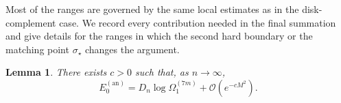 \documentclass[a4paper]{article}
\newtheorem{lemma}[theorem]{Lemma}
\numberwithin{equation}{section}
\begin{document}

Most of the ranges are governed by the same local estimates as in the
disk-complement case.  We record every contribution needed in the final
summation and give details for the ranges in which the second hard boundary or
the matching point $\sigma_\star$ changes the argument.
\begin{lemma}\label{lemma:asymptotic expansion E0 annulus}
There exists $c>0$ such that, as $n\to\infty$,
\[
    E_{0}^{(\mathrm{an})}
    =
    D_n\log \Omega_{1}^{(7m)}+\mathcal{O}(e^{-cM^2}). 
\]
\end{lemma}
\end{document}
